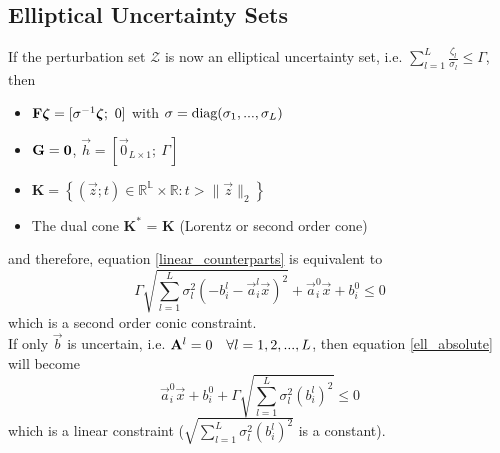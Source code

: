 \subsection{Elliptical Uncertainty Sets} \label{ellip}
If the perturbation set $\mathcal{Z}$ is now an elliptical uncertainty set, i.e. $\textstyle{\sum}_{l=1}^L\frac{\zeta_l}{\sigma_l} \leq \Gamma$, then 
\begin{itemize}
	\item $\mathbf{F}\bm{\zeta} = [\mathbf{\sigma}^{-1}\bm{\zeta};\ 0]$ with $\mathbf{\sigma} = \text{diag}(\sigma_1,...,\sigma_L)$
	\item $\mathbf{G} = \mathbf{0}$, $\vec{h} = [\vec{0}_{L \times 1};\ \Gamma]$
	\item $\mathbf{K} = \left\{(\vec{z};t) \in \mathbb{R^L} \times \mathbb{R}: t > \|\vec{z}\|_{2} \right\}$
	\item The dual cone $\mathbf{K}^*$ = $\mathbf{K}$ (Lorentz or second order cone)
\end{itemize}
and therefore, equation \eqref{linear_counterparts} is equivalent to
\begin{equation}
\Gamma \sqrt{\textstyle{\sum}_{l=1}^L \sigma_l^2(- b^l_{i} - \vec{a}^l_{i}\vec{x})^2} + \vec{a}^0_{i}\vec{x} + b^0_{i} \leq 0
\label{ell_absolute}
\end{equation}
which is a second order conic constraint.\\
If only $\vec{b}$ is uncertain, i.e. $\mathbf{A}^l = 0 \quad \forall l = 1,2,...,L$, then equation \eqref{ell_absolute} will become
\begin{equation}
\vec{a}^0_{i}\vec{x} + b^0_{i} + \Gamma \sqrt{\textstyle{\sum}_{l=1}^L \sigma_l^2(b^l_{i})^2} \leq 0
\label{ell_coeff}
\end{equation}
which is a linear constraint ($\sqrt{\textstyle{\sum}_{l=1}^L \sigma_l^2(b^l_{i})^2}$ is a constant).
\begin{comment}
\subsection{Norm-one Uncertainty Sets}
Briefly, if the perturbation set is a norm-one uncertainty set, i.e. $\|\vec{\zeta}\|_1 \leq \Gamma$, then if $\mat{A}^l = 0$, the robust counterparts is equivalent to
\begin{equation}
\textstyle{\sum}_{l=1}^L \vec{a}^0_{i}\vec{x} + b^0_{i} + \Gamma \max_{l=1,..,L} |b^l_{i}| \leq 0
\label{rom_coeff}
\end{equation}
while if $\mat{A}$ is uncertain, then \eqref{linear_counterparts} is equivalent to
\begin{equation}
\begin{aligned}
\Gamma w_{i} + \vec{a}^0_{i}\vec{x} + b^0_{i} &\leq 0\\
- b^l_{i} - \vec{a}^l_{i}\vec{x} &\leq w_{i} &&\forall l \in 1,...,L\\
b^l_{i} + \vec{a}^l_{i}\vec{x} &\leq w_{i} &&\forall l \in 1,...,L\\
\end{aligned}
\label{rom_linear}
\end{equation}
\end{comment}